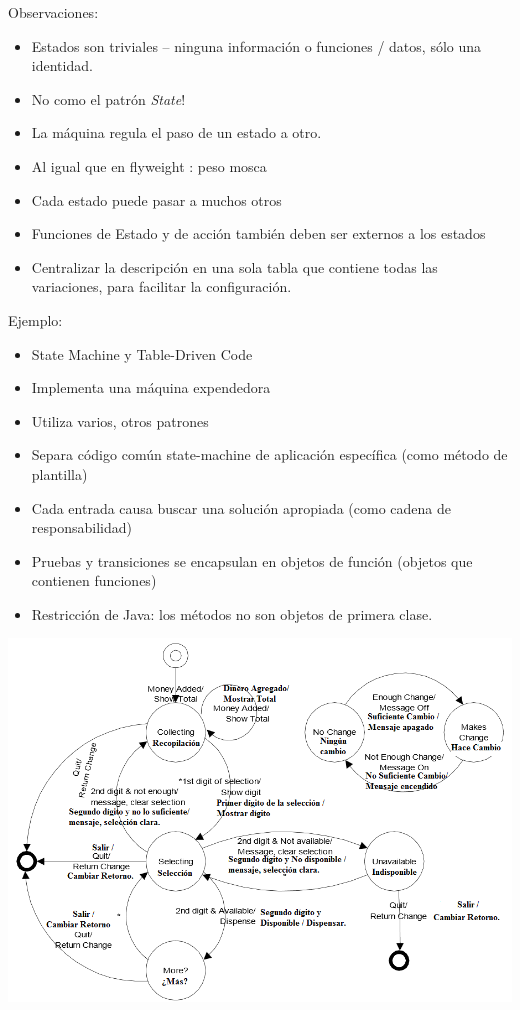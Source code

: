 \documentclass{article}
\begin{document}
Observaciones:

\begin{itemize}
    \item Estados son triviales – ninguna información o funciones / datos, sólo una identidad.
    \item No como el patrón \textit{State}!
    \item La máquina regula el paso de un estado a otro.
    \item Al igual que en flyweight : peso mosca
    \item Cada estado puede pasar a muchos otros
    \item Funciones de Estado y de acción también deben ser externos a los estados
    \item Centralizar la descripción en una sola tabla que contiene todas las variaciones, para facilitar la configuración.
\end{itemize}

Ejemplo:

\begin{itemize}
    \item State Machine y Table-Driven Code 
    \item Implementa una máquina expendedora
    \item Utiliza varios, otros patrones
    \item Separa código común state-machine  de aplicación específica (como método de plantilla)
    \item Cada entrada causa buscar una solución apropiada (como cadena de responsabilidad)
    \item Pruebas y transiciones se encapsulan en objetos de función (objetos que contienen funciones)
    \item Restricción de Java: los métodos no son objetos de primera clase.
\end{itemize}

\includegraphics[width=\textwidth]{Pagina63}   
  
\end{document}
